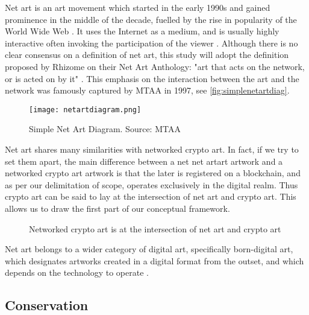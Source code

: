 Net art is an art movement which started in the early 1990s and gained prominence in the middle of the decade, fuelled by the rise in popularity of the World Wide Web \cite{schreiberNetArtShedding2001}. It uses the Internet as a medium, and is usually highly interactive often invoking the participation of the viewer \cite{kholeifInternet_ArtBirthWeb2023}. Although there is no clear consensus on a definition of net art, this study will adopt the definition proposed by Rhizome on their Net Art Anthology: "art that acts on the network, or is acted on by it" \cite{WhatNetArt2017}.
This emphasis on the interaction between the art and the network was famously captured by MTAA in 1997, see \autoref{fig:simplenetartdiag}.

\begin{figure}[h]
    \centering
    \captionsetup{justification=centering}
    \texttt{[image: netartdiagram.png]}
    \caption[Simple Net Art Diagram]{Simple Net Art Diagram. Source: MTAA \cite{NETARTANTHOLOGY2016a}}
    \label{fig:simplenetartdiag}
\end{figure}

Net art shares many similarities with networked crypto art. In fact, if we try to set them apart, the main difference between a net net artart artwork and a networked crypto art artwork is that the later is registered on a blockchain, and as per our delimitation of scope, operates exclusively in the digital realm. Thus crypto art can be said to lay at the intersection of net art and crypto art. This allows us to draw the first part of our conceptual framework.


\begin{figure}[h]
    \centering
    \captionsetup{justification=centering}
    
    \caption[Networked crypto art vs net art vs crypto art]{Networked crypto art is at the intersection of net art and crypto art}
    \label{fig:netart-crypto-art}
\end{figure}

Net art belongs to a wider category of digital art, specifically born-digital art, which designates artworks created in a digital format from the outset, and which depends on the technology to operate \cite{innocentiKeepingBitsAlive2013}.

\subsection{Conservation}

